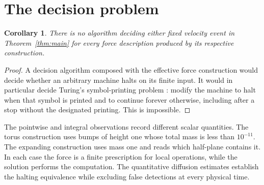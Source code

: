 \documentclass[11pt]{article}
\newtheorem{corollary}[theorem]{Corollary}
\theoremstyle{definition}
\theoremstyle{remark}
\begin{document}
\section{The decision problem}\label{sec:decision}

\begin{corollary}
There is no algorithm deciding either fixed velocity event in
Theorem~\ref{thm:main} for every force description produced by its
respective construction.
\end{corollary}
\begin{proof}
A decision algorithm composed with the effective force construction
would decide whether an arbitrary machine halts on its finite input.
It would in particular decide Turing's symbol-printing problem
\cite[Section~8]{Turing1936}: modify the machine to halt when that symbol
is printed and to continue forever otherwise, including after a stop
without the designated printing. This is impossible.
\end{proof}

The pointwise and integral observations record different scalar
quantities. The torus construction uses bumps of height one whose total
mass is less than $10^{-11}$. The expanding construction uses mass one
and reads which half-plane contains it. In each case the force is a
finite prescription for local operations, while the solution performs
the computation. The quantitative diffusion estimates establish the
halting equivalence while excluding false detections at every physical
time.


{}

\end{document}
